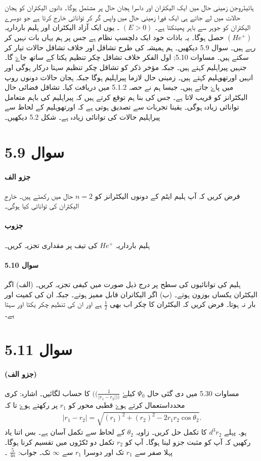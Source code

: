 ہائیڈروجن زمینی حال میں ایک الیکٹران اور داسرا ہجان حال پر مشتمل ہوگا۔ دانوں الیکٹران کو ہجان حالات میں لے جاتے ہی ایک فورا زمینی حال میں واپس گر کر توانائی خارج کرتا ہے جو دوسرے الیکٹران کو جوہر سے باہر  پھینکتا ہے۔ $ (E>0) $ ۔ یوں ایک آزاد الیکٹران اور ہلیم بارداریہ $ ( He^+ ) $ حصل ہوگا۔ یہ باذات خود ایک
دلچسپ نظام ہے جس پر ہم یہاں بات نہیں کر رہے ہیں۔ سوال 5.9 دیکھیں۔ ہم ہمیشہ کی طرح تشاقل اور خلاف تشاقل حالات تیار کر سکتے ہیں۔ مساوات 5.10;  اول الفکر خلاف تشاقل چکر تنظیم یکتا کے ساتھ جاۓ گا۔ جنہیں پیراہلیم کہتے ہیں۔ جبکہ مؤخر ذکر کو تشاقل چکر تنظیم سہتا درکار ہوگی اور انہیں اورتھوہلیم کہتے ہیں۔ زمینی حال لازما پیراہلیم ہوگا جبکہ ہجان حالات دونوں روپ میں پاۓ جاتے ہیں۔ جیسا ہم نے حصہ 5.1.2 میں دریافت کیا۔ تشاقل فضائی حال الیکٹرانز کو قریب لاتا ہے۔ جس کی بنا ہم توقع کرتے ہیں کہ پیراہلیم کی باہم متعامل توانائی زیادہ ہوگی۔ یقینا تجربات سے تصدیق ہوتی ہے کہ اورتھوہلیم کے لحاظ سے پیراہلیم حالات کی توانائی زیادہ ہے۔ شکل 5.2 دیکھیں۔
\section*{سوال 5.9}
\paragraph*{جزو الف}
فرض کریں کہ آپ ہلیم ایٹم کے دونوں الیکٹرانز کو $ n=2 $ حال میں رکھتے ہیں۔ خارج الیکٹران کی توانائی کیا ہوگی۔
\paragraph*{جزوب}
ہلیم بارداریہ $ He^+ $ کی تیف پر مقداری تجزیہ کریں۔ 
\paragraph*{سوال 5.10}
ہلیم کی توانائیوں کی سطح پر درج ذیل صورت میں کیفی تجزیہ کریں۔ (الف) اگر الیکٹران یکساں بوزون ہوتے۔ (ب) اگر الیکاتران قابل ممیز ہوتے۔ جبکہ ان کی کمیت اور بار نہ ہوتا۔ فرض کریں کہ الیکٹران کا چکر اب بھی $ \frac{1}{2} $ 
ہے اور ان کی تنظیم چکر یکتا اور سہتا ہے۔
\section*{سوال 5.11}
\paragraph*{(جزو الف)}
مساوات 5.30 میں دی گئی حال $ \Psi_{0} $  کیلۓ  $ ((\frac{1}{|r_{1} - r_{2} |))} $ کا حساب لگائیں۔ اشارہ: کری محدداستعمال کرتے ہوۓ قطبی محور کو $ r_{1} $ پر رکھتے ہوۓ تا کہ
\begin{align}
|r_{1}-r_{2}|= \sqrt{(r_{1})^2+ (r_{2})^2 -2r_{1} r_{2}\cos\theta_{2}}.
\end{align}
ہو۔ پہلے 
$ d^3 r_{2} $
  کا تکمل حل کریں۔ زاویہ 
  $ \theta_{2} $
   کے لحاظ سے تکمل آسان ہے۔ بس اتنا یاد رکھیں کہ آپ کو مثبت جزو لینا ہوگا۔ آپ کو  
   $ r_{2} $
    تکمل دو ٹکڑوں میں تقسیم کرنا ہوگا۔ پہلا صفر سے 
    $ r_{1} $ 
    تک اور دوسرا 
     $ r_{1} $ سے $ \infty $ تک۔ جواب: $\frac{5}{4a} $ ۔ 
